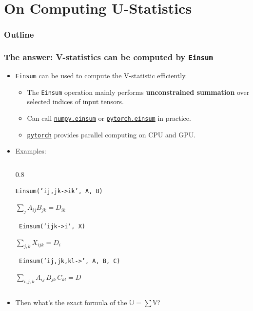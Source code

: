 \documentclass[9pt]{beamer}
\theoremstyle{mystyle}
\theoremstyle{mystyletwo}
\newcommand{\libref}[2]{\href{#2}{\texttt{#1}}}
\newcommand{\torch}{\libref{pytorch}{https://pytorch.org/}}
\newcommand{\numpyeinsum}{\libref{numpy.einsum}{https://numpy.org/doc/2.1/reference/generated/numpy.einsum.html}}
\newcommand{\torcheinsum}{\libref{pytorch.einsum}{https://pytorch.org/docs/stable/generated/torch.einsum.html}}
\begin{document}
\section{On Computing U-Statistics}
\begin{frame}
    \frametitle{Outline}
    \tableofcontents[currentsection, sectionstyle=show/shaded, subsectionstyle=show/shaded/shaded]
\end{frame}

\begin{frame}
\frametitle{The answer: V-statistics can be computed by \texttt{Einsum}}

    \begin{itemize}
        \item \texttt{Einsum} can be used to compute the V-statistic efficiently.
              \begin{itemize}
                    \item The \texttt{Einsum} operation mainly performs \textbf{unconstrained summation} over selected indices of input tensors.
                  \item Can call \numpyeinsum{} or \torcheinsum{} in practice.
                  \item \torch{} provides parallel computing on CPU and GPU.
              \end{itemize}
        \item Examples:
        \begin{columns}
            \begin{column}{0.8\textwidth}
                \centering
                              
                \texttt{\large Einsum('ij,jk->ik', A, B)}
                
                \large $  \sum_j A_{ij} B_{jk} = D_{ik}$
                        
                \vspace{0.4cm}
        
                
                \texttt{ \large Einsum('ijk->i', X)}
                
                \large$ \sum_{j,k} X_{ijk} = D_i $
                
                \vspace{0.4cm}
                
                \texttt{ \large Einsum('ij,jk,kl->', A, B, C)}
                
                \large $  \sum_{i,j,k} A_{ij} \, B_{jk} \, C_{kl} = D$
                        
                \vspace{0.4cm}
            \end{column}
        \end{columns}

\item Then what's the exact formula of the $ \mathbb{U} = \sum \mathbb{V}$?

    \end{itemize}

\end{frame}
\end{document}
